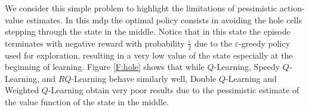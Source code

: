 We consider this simple problem to highlight the limitations of pessimistic action-value estimates. In this \gls{mdp} the optimal policy consists in avoiding the hole cells stepping through the state in the middle. Notice that in this state the episode terminates with negative reward with probability $\frac{\varepsilon}{2}$ due to the $\varepsilon$-greedy policy used for exploration, resulting in a very low value of the state especially at the beginning of learning. Figure \ref{F:hole} shows that while $Q$-Learning, Speedy $Q$-Learning, and $RQ$-Learning behave similarly well, Double $Q$-Learning and Weighted $Q$-Learning obtain very poor results due to the pessimistic estimate of the value function of the state in the middle.
\begin{figure}[t]
\begin{minipage}{\columnwidth}
\centering

\end{minipage}
\end{figure}

